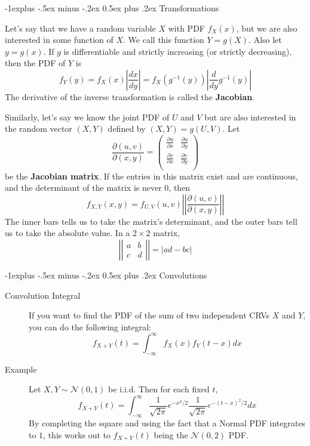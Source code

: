 \documentclass[6pt,landscape]{article}
\makeatletter
\renewcommand{\N}{\mathcal{N}}
\renewcommand{\subsection}{\@startsection{subsection}{2}{0mm}%
                                {-1explus -.5ex minus -.2ex}%
                                {0.5ex plus .2ex}%
                                {\normalfont\normalsize\bfseries}}
\makeatother
\begin{document}
\begin{multicols*}{3}
\subsection{Transformations}
\begin{description}
    \label{one variable transformations}
    \item[One Variable Transformations] Let's say that we have a random variable $X$ with PDF $f_X(x)$, but we are also interested in some function of $X$. We call this function $Y = g(X)$. Also let $y=g(x)$. If $g$ is differentiable and strictly increasing (or strictly decreasing), then the PDF of $Y$ is
    \[f_Y(y) = f_X(x)\left|\frac{dx}{dy}\right| =  f_X(g^{-1}(y))\left|\frac{d}{dy}g^{-1}(y)\right|\]
    The derivative of the inverse transformation is called the \textbf{Jacobian}.


     \item[Two Variable Transformations] Similarly, let's say we know the joint PDF of $U$ and $V$ but are also interested in the random vector $(X, Y)$ defined by $(X, Y) = g(U, V)$. Let 
       $$  \frac{\partial (u,v)}{\partial (x,y)}  = \begin{pmatrix} 
              \frac{\partial u}{\partial x} &  \frac{\partial u}{\partial y} \\
           \frac{\partial v}{\partial x} & \frac{\partial v}{\partial y}   \\
        \end{pmatrix}$$
     be the \textbf{Jacobian matrix}. If the entries in this matrix exist and are continuous, and the determinant of the matrix is never $0$, then
     \[f_{X,Y}(x, y) = f_{U,V}(u,v) \left|\left|   \frac{\partial (u,v)}{\partial (x,y)}\right| \right| \]
   The inner bars tells us to take the matrix's determinant, and the outer bars tell us to take the absolute value.  In a $2 \times 2$ matrix, 
     \[ \left| \left|
     \begin{array}{ccc}
         a & b \\
         c & d
     \end{array}
     \right| \right| = |ad - bc|\]

\end{description}

\label{convolutions}
\subsection{Convolutions}
\begin{description}
    \item[Convolution Integral] If you want to find the PDF of the sum of two independent CRVs $X$ and $Y$, you can do the following integral:
        \[f_{X+Y}(t)=\int_{-\infty}^\infty f_X(x)f_Y(t-x)dx\]
    \item[Example] Let $X,Y \sim \N(0,1)$ be i.i.d. Then for each fixed $t$,\[f_{X+Y}(t)=\int_{-\infty}^\infty \frac{1}{\sqrt{2\pi}}e^{-x^2/2} \frac{1}{\sqrt{2\pi}}e^{-(t-x)^2/2} dx\]
By completing the square and using the fact that a Normal PDF integrates to $1$, this works out to $f_{X+Y}(t)$ being the $\N(0,2)$ PDF.
\end{description}


\end{multicols*}
\end{document}
